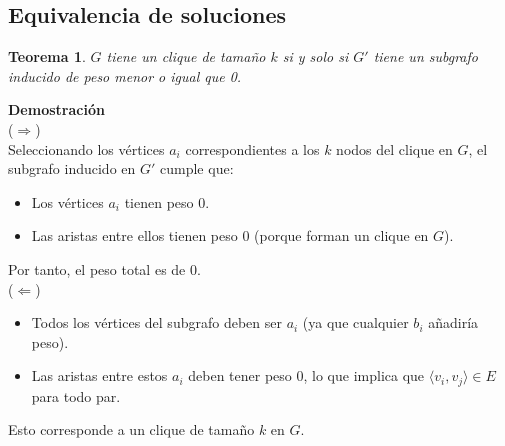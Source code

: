 \documentclass[letterpaper, 12pt]{report}
\newtheorem*{theorem*}{Teorema}
\begin{document}

\subsection{Equivalencia de soluciones}

\begin{theorem*}
    $G$ tiene un clique de tamaño $k$ si y solo si $G'$ tiene un subgrafo inducido de peso menor o igual que 0.
\end{theorem*}

\noindent
\textbf{Demostración} \\


($\Rightarrow$) \\


Seleccionando los vértices $ a_i $ correspondientes a los $ k $ nodos del clique en $ G $, el subgrafo inducido en $ G' $ cumple que:  

\begin{itemize}
    \item Los vértices $ a_i $ tienen peso 0.  
    \item Las aristas entre ellos tienen peso 0 (porque forman un clique en $ G $).  
\end{itemize}

Por tanto, el peso total es de 0. \\

($\Leftarrow$) \\ 
 
\begin{itemize}
    \item Todos los vértices del subgrafo deben ser $ a_i $ (ya que cualquier $ b_i $ añadiría peso).
    \item Las aristas entre estos $ a_i $ deben tener peso 0, lo que implica que $ \langle v_i, v_j \rangle \in E $ para todo par.      
\end{itemize}

Esto corresponde a un clique de tamaño $ k $ en $ G $.  





\end{document}
